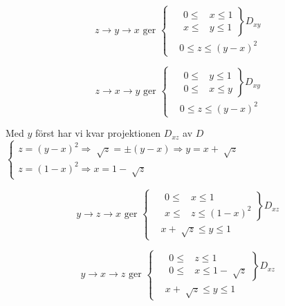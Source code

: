 \documentclass[a4paper]{article}
\let\oldsqrt\sqrt
\renewcommand*{\sqrt}[2][\ ]{\oldsqrt[#1]{#2} }
\begin{document}
\begin{equation}
z\rightarrow y\rightarrow x \text{ ger }
\begin{cases}
&\left.\begin{array}{rcl}
0 \leq &x \leq 1 \\
x \leq &y \leq 1 \end{array}\right\}	D_{xy} \\
&0 \leq z \leq (y-x)^2
\end{cases}
\end{equation}


\begin{equation} \label{eq:10.1}
z\rightarrow x\rightarrow y \text{ ger }
\begin{cases}
&\left.\begin{array}{rcl}
0 \leq &y \leq 1 \\
0 \leq &x \leq y \end{array}\right\}	D_{xy} \\
&0 \leq z \leq (y-x)^2
\end{cases}
\end{equation}


Med $y$ först har vi kvar projektionen $D_{xz}$ av $D$ \newline
$\begin{cases}
z = (y-x)^2 \Rightarrow \sqrt{z} = \pm (y-x) \Rightarrow y = x+\sqrt{z} \\
z = (1-x)^2 \Rightarrow x = 1 - \sqrt{z}
\end{cases}$


\begin{equation}
y\rightarrow z\rightarrow x \text{ ger }
\begin{cases}
&\left.\begin{array}{rcl}
0 \leq &x \leq 1 \\
x \leq &z \leq (1-x)^2 \end{array}\right\} D_{xz} \\
&x+\sqrt{z} \leq y \leq 1
\end{cases}
\end{equation}


\begin{equation}
y\rightarrow x\rightarrow z \text{ ger }
\begin{cases}
&\left.\begin{array}{rcl}
0 \leq &z \leq 1 \\
0 \leq &x \leq 1-\sqrt{z} \end{array}\right\} D_{xz} \\
&x+\sqrt{z} \leq y \leq 1
\end{cases}
\end{equation}
\end{document}
